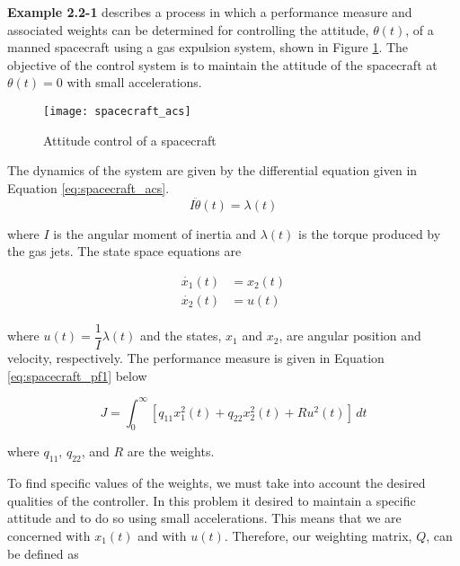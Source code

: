 
\begin{question}{1}
\end{question}
\textbf{Example 2.2-1} describes a process in which a performance measure and
associated weights can be determined for controlling the attitude, $\theta(t)$,
of a manned spacecraft using a gas expulsion system, shown in Figure \ref{fig:spacecraft_acs}.
The objective of the control system is to maintain the attitude of the
spacecraft at $\theta(t) = 0$ with small accelerations.

\begin{figure}[H]
    \texttt{[image: spacecraft\_acs]}
    \centering
    \caption{Attitude control of a spacecraft \cite{kirkdover}}
    \label{fig:spacecraft_acs}
\end{figure}

The dynamics of the system are given by the differential equation given in
Equation \ref{eq:spacecraft_acs}.
\begin{equation}
    I \ddot{\theta}(t) = \lambda(t) \label{eq:spacecraft_acs}
\end{equation}

\noindent where $I$ is the angular moment of inertia and $\lambda(t)$ is the
torque produced by the gas jets. The state space equations are

\begin{align}
    \dot{x_1}(t) &= x_2 (t) \nonumber \\
    \dot{x_2}(t) &= u (t) \nonumber
\end{align}

\noindent where $u(t) = \dfrac{1}{I} \lambda(t)$ and the states, $x_1$ and
$x_2$, are angular position and velocity, respectively. The performance measure
is given in Equation \ref{eq:spacecraft_pf1} below

\begin{equation}
    J = \int_{0}^{\infty} [q_{11} x_1^2(t) + q_{22} x_2^2(t) + R u^2 (t)] \, dt
    \label{eq:spacecraft_pf1}
\end{equation}

\noindent where $q_{11}$, $q_{22}$, and $R$ are the weights.

To find specific values of the weights, we must take into account the desired
qualities of the controller. In this problem it desired to maintain a specific
attitude and to do so using small accelerations. This means that we are
concerned with $x_1(t)$ and with $u(t)$. Therefore, our weighting matrix, $Q$,
can be defined as

